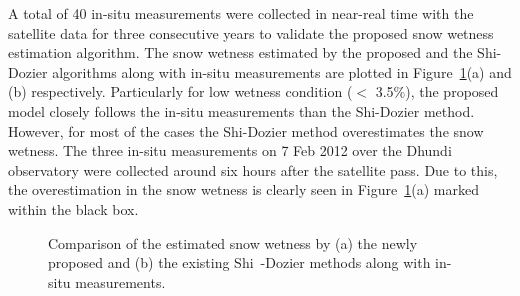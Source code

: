 A total of 40 in-situ measurements were collected in near-real time with the satellite data for three consecutive years to validate the proposed snow wetness estimation algorithm. The snow wetness estimated by the proposed and the Shi-Dozier algorithms along with in-situ measurements are plotted in Figure~\ref{fig:validation_plot_fullpol_SW}(a) and (b) respectively. Particularly for low wetness condition ($<$ 3.5$\%$), the proposed model closely follows the in-situ measurements than the Shi-Dozier method. However, for most of the cases the Shi-Dozier method overestimates the snow wetness. The three in-situ measurements on 7 Feb 2012 over the Dhundi observatory were collected around six hours after the satellite pass. Due to this, the overestimation in the snow wetness is clearly seen in Figure~\ref{fig:validation_plot_fullpol_SW}(a) marked within the black box.
\begin{figure}[!thpb]
	\centering
	\caption [Validation of the snow wetness estimation methods from full polarimetry SAR data]{Comparison of the estimated snow wetness by (a) the newly proposed and (b) the existing Shi~-Dozier methods along with in-situ measurements.} 
	\label{fig:validation_plot_fullpol_SW}
\end{figure}
\FloatBarrier
